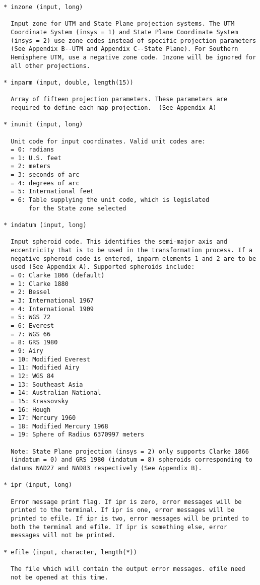 \begin{verbatim}
* inzone (input, long)

  Input zone for UTM and State Plane projection systems. The UTM
  Coordinate System (insys = 1) and State Plane Coordinate System
  (insys = 2) use zone codes instead of specific projection parameters
  (See Appendix B--UTM and Appendix C--State Plane). For Southern
  Hemisphere UTM, use a negative zone code. Inzone will be ignored for
  all other projections.

* inparm (input, double, length(15))

  Array of fifteen projection parameters. These parameters are
  required to define each map projection.  (See Appendix A)

* inunit (input, long)

  Unit code for input coordinates. Valid unit codes are:
  = 0: radians
  = 1: U.S. feet
  = 2: meters
  = 3: seconds of arc
  = 4: degrees of arc
  = 5: International feet
  = 6: Table supplying the unit code, which is legislated
       for the State zone selected

* indatum (input, long)

  Input spheroid code. This identifies the semi-major axis and
  eccentricity that is to be used in the transformation process. If a
  negative spheroid code is entered, inparm elements 1 and 2 are to be
  used (See Appendix A). Supported spheroids include:
  = 0: Clarke 1866 (default)
  = 1: Clarke 1880
  = 2: Bessel
  = 3: International 1967
  = 4: International 1909
  = 5: WGS 72
  = 6: Everest
  = 7: WGS 66
  = 8: GRS 1980
  = 9: Airy
  = 10: Modified Everest
  = 11: Modified Airy
  = 12: WGS 84
  = 13: Southeast Asia
  = 14: Australian National
  = 15: Krassovsky
  = 16: Hough
  = 17: Mercury 1960
  = 18: Modified Mercury 1968
  = 19: Sphere of Radius 6370997 meters

  Note: State Plane projection (insys = 2) only supports Clarke 1866
  (indatum = 0) and GRS 1980 (indatum = 8) spheroids corresponding to
  datums NAD27 and NAD83 respectively (See Appendix B).

* ipr (input, long)

  Error message print flag. If ipr is zero, error messages will be
  printed to the terminal. If ipr is one, error messages will be
  printed to efile. If ipr is two, error messages will be printed to
  both the terminal and efile. If ipr is something else, error
  messages will not be printed.

* efile (input, character, length(*))

  The file which will contain the output error messages. efile need
  not be opened at this time.


\end{verbatim}
